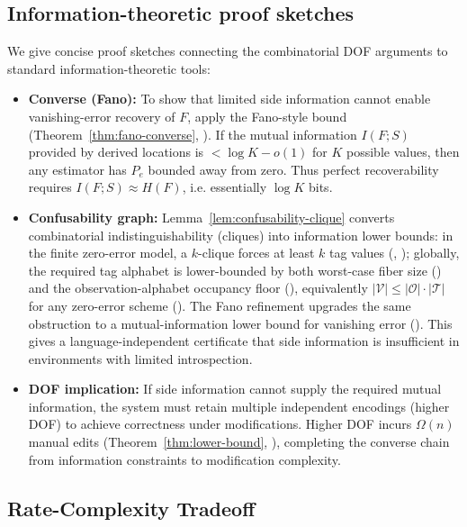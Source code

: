 \subsection{Information-theoretic proof sketches}
\label{sec:info-sketches}

We give concise proof sketches connecting the combinatorial DOF arguments to standard information-theoretic tools:

\begin{itemize}
\item \textbf{Converse (Fano):} To show that limited side information cannot enable vanishing-error recovery of $F$, apply the Fano-style bound (Theorem~\ref{thm:fano-converse}, ). If the mutual information $I(F;S)$ provided by derived locations is $<\log K - o(1)$ for $K$ possible values, then any estimator has $P_e$ bounded away from zero. Thus perfect recoverability requires $I(F;S)\approx H(F)$, i.e. essentially $\log K$ bits.

\item \textbf{Confusability graph:} Lemma~\ref{lem:confusability-clique} converts combinatorial indistinguishability (cliques) into information lower bounds: in the finite zero-error model, a $k$-clique forces at least $k$ tag values (, ); globally, the required tag alphabet is lower-bounded by both worst-case fiber size () and the observation-alphabet occupancy floor (), equivalently $|\mathcal V|\le |\mathcal O|\cdot |\mathcal T|$ for any zero-error scheme (). The Fano refinement upgrades the same obstruction to a mutual-information lower bound for vanishing error (). This gives a language-independent certificate that side information is insufficient in environments with limited introspection.

\item \textbf{DOF implication:} If side information cannot supply the required mutual information, the system must retain multiple independent encodings (higher DOF) to achieve correctness under modifications. Higher DOF incurs $\Omega(n)$ manual edits (Theorem~\ref{thm:lower-bound}, ), completing the converse chain from information constraints to modification complexity.
\end{itemize}


\subsection{Rate-Complexity Tradeoff}\label{sec:ssot-vs-m}

